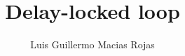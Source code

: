 \documentclass[14pt, aspectratio=169]{beamer}
\title{Delay-locked loop}
\author{Luis Guillermo Macias Rojas}
\begin{document}
    \maketitle

    \begin{frame}
        \tableofcontents
    \end{frame}

    
    
    
\end{document}
